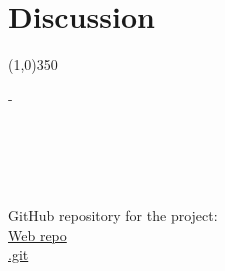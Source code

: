 \documentclass{article}
\begin{document}
	
	
	\section{Discussion}
		
	
	\begin{center}
		\line(1,0){350}
	\end{center}
	-
	\\ \\ \\ \\ \\ \\
	GitHub repository for the project: \\
	\href{https://github.com/catsymptote/matrixMaths}{Web repo} \\
	\href{https://github.com/catsymptote/matrixMaths.git}{.git}
	
	
	\clearpage
	
	
	
\end{document}
